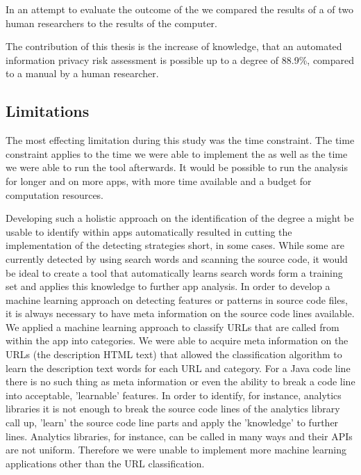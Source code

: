 In an attempt to evaluate the outcome of the \aiprat we compared the results of a \sca of two human researchers to the results of the computer.

The contribution of this thesis is the increase of knowledge, that an automated information privacy risk assessment is possible up to a degree of 88.9\%, compared to a manual \sca by a human researcher.

\subsection{Limitations}\label{chapter:Limitations}

The most effecting limitation during this study was the time constraint.
The time constraint applies to the time we were able to implement the \aiprat as well as the time we were able to run the tool afterwards.
It would be possible to run the analysis for longer and on more apps, with more time available and a budget for computation resources.

Developing such a holistic approach on the identification of the degree a \sca might be usable to identify \ipr within \mH apps automatically resulted in cutting the implementation of the \ipr detecting strategies short, in some cases.
While some \ipr are currently detected by using search words and scanning the source code, it would be ideal to create a tool that automatically learns search words form a training set and applies this knowledge to further app analysis.
In order to develop a machine learning approach on detecting features or patterns in source code files, it is always necessary to have meta information on the source code lines available.
We applied a machine learning approach to classify URLs that are called from within the app into categories. 
We were able to acquire meta information on the URLs (the description HTML text) that allowed the classification algorithm to learn the description text words for each URL and category.
For a Java code line there is no such thing as meta information or even the ability to break a code line into acceptable, 'learnable' features.
In order to identify, for instance, analytics libraries it is not enough to break the source code lines of the analytics library call up, 'learn' the source code line parts and apply the 'knowledge' to further lines.
Analytics libraries, for instance, can be called in many ways and their \acs{API}s are not uniform.
Therefore we were unable to implement more machine learning applications other than the URL classification.

